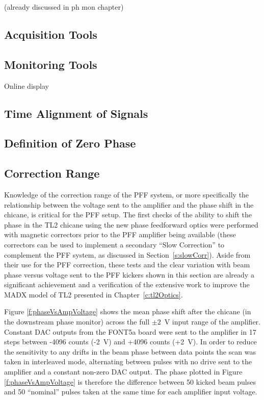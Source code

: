 (already discussed in ph mon chapter)

\subsection{Acquisition Tools}
\label{ss:acqTools}

\subsection{Monitoring Tools}
\label{ss:monTools}

Online display

\subsection{Time Alignment of Signals}
\label{ss:timeAlignment}

\subsection{Definition of Zero Phase}
\label{ss:zeroPhase}




\subsection{Correction Range}
\label{ss:corrRange}

Knowledge of the correction range of the PFF system, or more specifically the relationship between the voltage sent to the amplifier and the phase shift in the chicane, is critical for the PFF setup. The first checks of the ability to shift the phase in the TL2 chicane using the new phase feedforward optics were performed with magnetic correctors prior to the PFF amplifier being available (these correctors can be used to implement a secondary ``Slow Correction'' to complement the PFF system, as discussed in Section~\ref{s:slowCorr}). Aside from their use for the PFF correction, these tests and the clear variation with beam phase versus voltage sent to the PFF kickers shown in this section are already a significant achievement and a verification of the extensive work to improve the MADX model of TL2 presented in Chapter~\ref{c:tl2Optics}. 

Figure \ref{f:phaseVsAmpVoltage} shows the mean phase shift after the chicane (in the downstream phase monitor) across the full \(\pm2\)~V input range of the amplifier. Constant DAC outputs from the FONT5a board were sent to the amplifier in 17 steps between -4096 counts (-2~V) and +4096 counts (+2~V). In order to reduce the sensitivity to any drifts in the beam phase between data points the scan was taken in interleaved mode, alternating between pulses with no drive sent to the amplifier and a constant non-zero DAC output. The phase plotted in Figure \ref{f:phaseVsAmpVoltage} is therefore the difference between 50 kicked beam pulses and 50 ``nominal'' pulses taken at the same time for each amplifier input voltage. 

